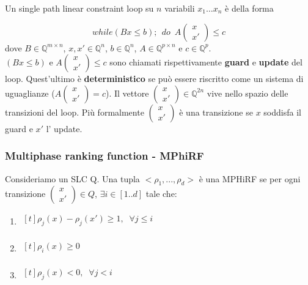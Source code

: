 \begin{mydef}
	Un single path linear constraint loop  su $n$ variabili $x_1 \ldots x_n$ \`e
	della forma
	
	\[
	while (Bx \leq b); \:\: do \: \;A \begin{pmatrix}x\\x'\end{pmatrix} \leq c
	\] 
	dove $B \in \mathbb{Q}^{m \times n}$, $x,x' \in \mathbb{Q}^n$, $b \in
	\mathbb{Q}^n$, $A \in \mathbb{Q}^{p \times n}$ e $c \in
	\mathbb{Q}^p$. \\ $(Bx \leq b)$ e $A \begin{pmatrix}x\\x'\end{pmatrix} \leq c$
	sono chiamati rispettivamente \textbf{guard} e \textbf{update} del loop.
	Quest'ultimo è \textbf{deterministico} se pu\`o essere riscritto come un sistema
	di uguaglianze ($A \begin{pmatrix}x\\x'\end{pmatrix} = c$).
	Il vettore $\begin{pmatrix}x\\x'\end{pmatrix} \in \mathbb{Q}^{2n}$ vive nello
	spazio delle transizioni del loop. Pi\`u formalmente 
	$\begin{pmatrix}x\\x'\end{pmatrix}$ è una transizione se $x$  soddisfa il guard 
	e $x'$ l' update.
\end{mydef}

\subsubsection{Multiphase ranking function - MPhiRF}

Consideriamo un SLC Q. Una tupla \(<\rho_1,...,\rho_d>\) è una MPHiRF
se per ogni transizione \(\begin{pmatrix}x\\x'\end{pmatrix} \in Q\), \(\exists i \in [1..d]\) tale che:
\begin{enumerate}
	\item $\begin{aligned}[t]
	\rho_j(x)-\rho_j(x') \geq 1, \;\;\forall j \leq i\\
	\end{aligned}$
	\item $\begin{aligned}[t]
	\rho_i(x) \geq 0\\
	\end{aligned}$
	\item $\begin{aligned}[t]
	\rho_j(x)< 0,  \;\;\forall j<i\\
	\end{aligned}$
\end{enumerate}

